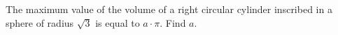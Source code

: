The maximum value of the volume of a right circular cylinder inscribed in a sphere of radius $\sqrt{3}$ is equal to $a \cdot \pi$. Find $a$. 